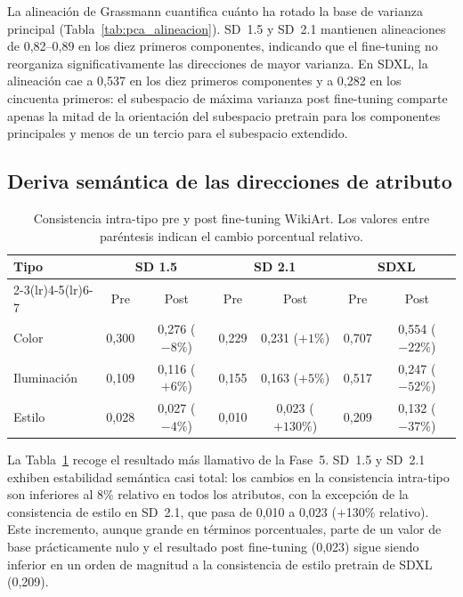 \documentclass[12pt, a4paper, twoside]{book}
\begin{document}
La alineación de Grassmann cuantifica cuánto ha rotado la base de varianza principal (Tabla~\ref{tab:pca_alineacion}). SD~1.5 y SD~2.1 mantienen alineaciones de 0,82--0,89 en los diez primeros componentes, indicando que el fine-tuning no reorganiza significativamente las direcciones de mayor varianza. En SDXL, la alineación cae a 0,537 en los diez primeros componentes y a 0,282 en los cincuenta primeros: el subespacio de máxima varianza post fine-tuning comparte apenas la mitad de la orientación del subespacio pretrain para los componentes principales y menos de un tercio para el subespacio extendido.

\subsection{Deriva semántica de las direcciones de atributo}

\begin{table}[htb]
\centering
\caption{Consistencia intra-tipo pre y post fine-tuning WikiArt. Los valores entre paréntesis indican el cambio porcentual relativo.}
\label{tab:deriva_semantica_consistencia}
\small
\begin{tabular}{lcccccc}
\toprule
\textbf{Tipo} & \multicolumn{2}{c}{\textbf{SD 1.5}} & \multicolumn{2}{c}{\textbf{SD 2.1}} & \multicolumn{2}{c}{\textbf{SDXL}} \\
\cmidrule(lr){2-3}\cmidrule(lr){4-5}\cmidrule(lr){6-7}
 & Pre & Post & Pre & Post & Pre & Post \\
\midrule
Color       & 0,300 & 0,276 {\small($-8\%$)}  & 0,229 & 0,231 {\small($+1\%$)}   & 0,707 & 0,554 {\small($-22\%$)} \\
Iluminación & 0,109 & 0,116 {\small($+6\%$)}  & 0,155 & 0,163 {\small($+5\%$)}   & 0,517 & 0,247 {\small($-52\%$)} \\
Estilo      & 0,028 & 0,027 {\small($-4\%$)}  & 0,010 & 0,023 {\small($+130\%$)} & 0,209 & 0,132 {\small($-37\%$)} \\
\bottomrule
\end{tabular}
\end{table}

La Tabla~\ref{tab:deriva_semantica_consistencia} recoge el resultado más llamativo de la Fase~5. SD~1.5 y SD~2.1 exhiben estabilidad semántica casi total: los cambios en la consistencia intra-tipo son inferiores al 8\% relativo en todos los atributos, con la excepción de la consistencia de estilo en SD~2.1, que pasa de 0,010 a 0,023 (+130\% relativo). Este incremento, aunque grande en términos porcentuales, parte de un valor de base prácticamente nulo y el resultado post fine-tuning (0,023) sigue siendo inferior en un orden de magnitud a la consistencia de estilo pretrain de SDXL (0,209).
\end{document}
